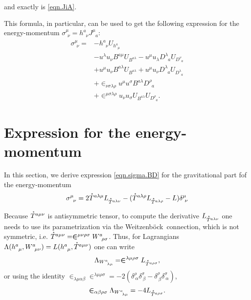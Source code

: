 \documentclass[
10pt, %
a4paper, %
oneside, %
twocolumn,
headinclude,footinclude, %
BCOR5mm, %
]{scrartcl}
\newcommand{\tetrsymbol}{h}
\newcommand{\tetr}[2]{\tetrsymbol^{#1}_{\phantom{#1}#2}}
\newcommand{\Dm}[2]{D_{\phantom{#2}#1}^{#2}}	%
\newcommand{\Bm}[2]{B^{#1#2}}	%
\newcommand{\w}[2]{W^{#1}_{\phantom{#1}#2}}
\newcommand{\We}{Weitzenb\"ock}
\newcommand{\Lag}{\Lambda}	%
\newcommand{\Laghodge}{L}%
\newcommand{\Um}{U}%
\newcommand{\EMmat}[2]{\sigma^{#1}_{\ \,#2}}
\newcommand{\LCsymb}{\bm{\in}}    %
\newcommand{\HDT}[1]{\accentset{\star}{T}^{#1}}
\newcommand{\KD}[2]{\delta^{#1}_{\ #2}}
\newcommand{\NC}[2]{J^{#2}_{\phantom{#2}#1}}
\begin{document}
	and exactly is \eqref{eqn.JiA}.
		
	This formula, in particular, can be used to get the following expression for the 
	energy-momentum $ 
	\EMmat{\mu}{\nu} = \tetr{a}{\nu} \NC{a}{\mu}$:
	\begin{align}
		\EMmat{\mu}{\nu} =
		& - \tetr{a}{\nu} \Um_{\tetr{a}{\mu}} \nonumber\\
		& - u^\lambda u_\nu \Bm{a}{\mu} \Um_{\Bm{a}{\lambda}} - u^\mu u_\lambda \Dm{a}{\lambda} 
		\Um_{\Dm{a}{\nu}}				\nonumber\\
		& + u^\mu u_\nu \Bm{a}{\lambda} \Um_{\Bm{a}{\lambda}} 
		+ u^\mu u_\nu \Dm{a}{\lambda} \Um_{\Dm{a}{\lambda}}
		\nonumber \\
		& + \LCsymb_{\nu\sigma\lambda\rho} u^\mu u^\sigma \Bm{a}{\lambda} \Dm{a}{\rho} 
		\nonumber \\
		&+ \LCsymb^{\mu\sigma\lambda\rho} u_\nu u_\sigma \Um_{\Bm{a}{\lambda}} 
		\Um_{\Dm{a}{\rho}}.\label{eqn.sigma.tetr.part}
	\end{align}
	
	
	\section{Expression for the energy-momentum}\label{app.energymomentum}
	
	In this section, we derive expression \eqref{eqn.sigma.BD} for the gravitational part fof the 
	energy-momentum
	\begin{equation}\label{eqn.EM.hodge}
		\EMmat{\mu}{\nu} =
		2 \HDT{a\lambda\mu}L_{\HDT{a\lambda\nu}} - 
		(\HDT{a\lambda\rho}L_{\HDT{a\lambda\rho}} - L) \KD{\mu}{\nu}
	\end{equation}
	
	Because $ \HDT{a\mu\nu} $ is 
	antisymmetric tensor, to compute the derivative $ \Laghodge_{\HDT{a\lambda\nu}} $ one needs to 
	use 
	its parametrization via the \We\ connection, which is not symmetric, i.e. $ \HDT{a\mu\nu} = 
	\LCsymb^{\mu\nu\rho\sigma} \w{a}{\rho\sigma}$. Thus, for Lagrangians $ 
	\Lag(\tetr{a}{\mu},\w{a}{\mu\nu}) = 
	\Laghodge(\tetr{a}{\mu},\HDT{a\mu\nu})$ one can write 
	\begin{equation}
		\Lag_{\w{a}{\lambda\mu}} = \LCsymb^{\lambda\mu\rho\sigma} \Laghodge_{\HDT{a\rho\sigma}},
	\end{equation}
	or using the identity $ \LCsymb_{\lambda\mu\alpha\beta}\LCsymb^{\lambda\mu\rho\sigma} = 
	-2(\KD{\rho}{\alpha}\KD{\sigma}{\beta} - \KD{\rho}{\beta}\KD{\sigma}{\alpha}) $, 
	\begin{equation}\label{eqn.L.T}
		\LCsymb_{\alpha\beta\rho\sigma}\Lag_{\w{a}{\lambda\mu}} = -4 \Laghodge_{\HDT{a\rho\sigma}}.
	\end{equation}
	
\end{document}
